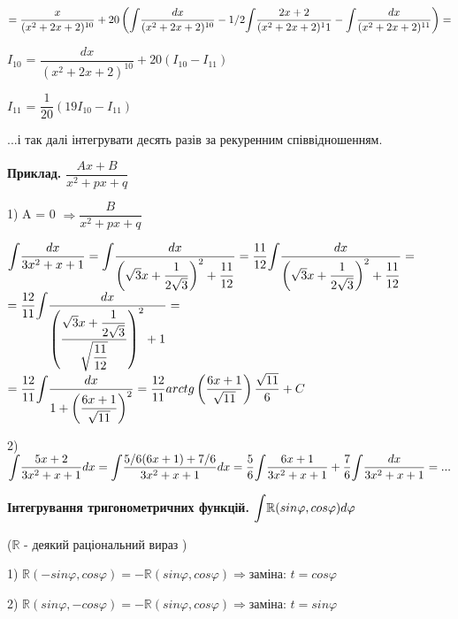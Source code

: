 \documentclass[12pt]{report}
\begin{document}
$ = \dfrac{x}{(x^2+2x+2)^{10}} + 20\left(\mathlarger\int \dfrac {dx}{(x^2 + 2x + 2)^{10}} - 1/2  \mathlarger\int \dfrac {2x+2}{(x^2+2x+2)^11} -   \mathlarger\int \dfrac {dx}{(x^2+2x+2)^
	{11}} \right) = $

\vspace{3mm} 
{\Large ${I_{10}}$ =} $\dfrac{dx}{(x^2+2x+2)^{10}}+ 20 (I_{10} - I_{11})$

\vspace{3mm} 
{\Large ${I_{11}}$ =}  $\dfrac{1}{20}(19I_{10} - I_{11})$

 \vspace{2mm} 

...і так далі інтегрувати десять разів за рекуренним співвідношенням.

\vspace{3mm} 

\textbf{Приклад.} $\dfrac{Ax+B}{x^2 + px + q} $

\vspace{2mm} 
1) A = 0 $\Rightarrow \dfrac{B}{x^2 + px + q} $
\vspace{3mm} 

$ \mathlarger\int\dfrac{dx}{3x^2+ x+ 1} =\mathlarger\int\dfrac{dx}{\left(\sqrt{3}x + \dfrac{1}{2 \sqrt{3}}\right)^2 + \dfrac{11}{12}} = \dfrac {11}{12}\mathlarger\int\dfrac{dx}{\left(\sqrt{3}x + \dfrac{1}{2 \sqrt{3}}\right)^2 + \dfrac{11}{12}} =$ $= \dfrac{12}{11}\mathlarger\int\dfrac{dx}{\left(\dfrac{\sqrt{3}x + \dfrac{1}{2 \sqrt{3}}}{\sqrt{\dfrac{11}{12}}}\right)^{2} + 1} = $
$= \dfrac{12}{11}\mathlarger\int\dfrac{dx}{1+\left( \dfrac{6x +1 }{\sqrt{11}}\right)^{2}} = 
 \dfrac{12}{11} arctg\left(\dfrac{6x+1}{\sqrt{11}}\right) \dfrac{\sqrt{11}}{6} + C$
 
 \vspace{3mm} 
 2) $ \mathlarger\int\dfrac{5x+2}{3x^2+x+1}dx = \mathlarger\int\dfrac{5/6(6x+1)+7/6}{3x^2 +x +1 } dx= \dfrac{5}{6} \mathlarger\int\dfrac{6x+1}{3x^2 + x+1 } +\dfrac{7}{6}\mathlarger\int\dfrac{dx} {3x^2+x+1} = ...$
 
  \vspace{5mm} 
 \textbf{Інтегрування тригонометричних функцій.} 
 $\mathlarger \int \mathbb{R}(sin\varphi ,cos\varphi)d\varphi$
 
 ($\mathbb{R}$ - деякий раціональний вираз )
 
 1) $ \mathbb{R}(-sin\varphi, cos\varphi)= -  \mathbb{R}(sin\varphi ,cos\varphi) \Rightarrow
 $заміна: $t = cos\varphi$ 
 
 2) $ \mathbb{R}(sin\varphi, -cos\varphi)=  -  \mathbb{R}(sin\varphi ,cos\varphi)\Rightarrow
 $заміна: $t = sin\varphi$
  
\end{document}
